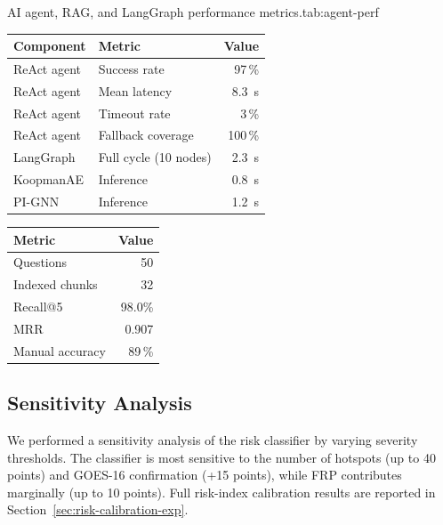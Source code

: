 \documentclass[preprint,12pt,times,numbers]{elsarticle}
\begin{document}
\begin{resulttable}{AI agent, RAG, and LangGraph performance metrics.}{tab:agent-perf}
\begin{minipage}[t]{0.48\linewidth}
\begin{tabular}{@{}llr@{}}
\toprule
\textbf{Component} & \textbf{Metric} & \textbf{Value} \\
\midrule
ReAct agent & Success rate & 97\,\% \\
ReAct agent & Mean latency & 8.3~s \\
ReAct agent & Timeout rate & 3\,\% \\
ReAct agent & Fallback coverage & 100\,\% \\
LangGraph & Full cycle (10 nodes) & 2.3~s \\
KoopmanAE & Inference & 0.8~s \\
PI-GNN & Inference & 1.2~s \\
\bottomrule
\end{tabular}
\end{minipage}\hfill
\begin{minipage}[t]{0.48\linewidth}
\begin{tabular}{@{}lr@{}}
\toprule
\textbf{Metric} & \textbf{Value} \\
\midrule
Questions & 50 \\
Indexed chunks & 32 \\
Recall@5 & 98.0\% \\
MRR & 0.907 \\
Manual accuracy & 89\,\% \\
\bottomrule
\end{tabular}
\label{tab:rag-benchmark}
\end{minipage}
\end{resulttable}



\subsection{Sensitivity Analysis}

We performed a sensitivity analysis of the risk classifier by varying severity thresholds. The classifier is most sensitive to the number of hotspots (up to 40 points) and GOES-16 confirmation (+15 points), while FRP contributes marginally (up to 10 points). Full risk-index calibration results are reported in Section~\ref{sec:risk-calibration-exp}.
\end{document}
